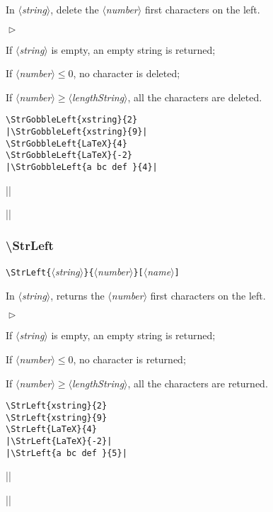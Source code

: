 \documentclass[a4paper,10pt]{article}
\newcommand\argu[1]{$\langle$\textit{#1}$\rangle$}
\newcommand\ARGU[1]{\texttt{\{}\argu{#1}\texttt{\}}}
\newcommand\arguC[1]{\texttt{[}\argu{#1}\texttt{]}}
\newenvironment{Conditions}[1][1cm]%
{\begin{list}%
	{$\vartriangleright$}%
	{\setlength{\leftmargin}{#1}
	 \setlength{\itemsep}{0pt}
	 \setlength{\parsep}{0pt}
	 \setlength{\topsep}{2ptplus3ptminus2pt}
	}}%
{\end{list}}
\newcommand\styleexemple{\small\vskip4pt}
\newcommand\verbinline{\lstinline[basicstyle=\normalsize\ttfamily]}
\begin{document}
In \argu{string}, delete the \argu{number} first characters on the left.\medskip

\begin{Conditions}
\item If \argu{string} is empty, an empty string is returned;
\item If \argu{number}${}\leqslant0$, no character is deleted;
\item If \argu{number}${}\geqslant{}$\argu{lengthString}, all the characters are deleted.
\end{Conditions}

\begin{minipage}[t]{0.65\linewidth}
\begin{lstlisting}
\StrGobbleLeft{xstring}{2}
|\StrGobbleLeft{xstring}{9}|
\StrGobbleLeft{LaTeX}{4}
\StrGobbleLeft{LaTeX}{-2}
|\StrGobbleLeft{a bc def }{4}|
\end{lstlisting}%
\end{minipage}\hfill
\begin{minipage}[t]{0.35\linewidth}
	\styleexemple
	\par
	||\par
	\par
	\par
	||
\end{minipage}%

\subsubsection{\ttfamily\textbackslash StrLeft}

\verbinline|\StrLeft|\ARGU{string}\ARGU{number}\arguC{name}
\smallskip

In \argu{string}, returns the \argu{number} first characters on the left.\medskip

\begin{Conditions}
\item If \argu{string} is empty, an empty string is returned;
\item If \argu{number}${}\leqslant0$, no character is returned;
\item If \argu{number}${}\geqslant{}$\argu{lengthString}, all the characters are returned.
\end{Conditions}

\begin{minipage}[t]{0.65\linewidth}
\begin{lstlisting}
\StrLeft{xstring}{2}
\StrLeft{xstring}{9}
\StrLeft{LaTeX}{4}
|\StrLeft{LaTeX}{-2}|
|\StrLeft{a bc def }{5}|
\end{lstlisting}%
\end{minipage}\hfill
\begin{minipage}[t]{0.35\linewidth}
	\styleexemple
	\par
	\par
	\par
	||\par
	||
\end{minipage}%
\end{document}
